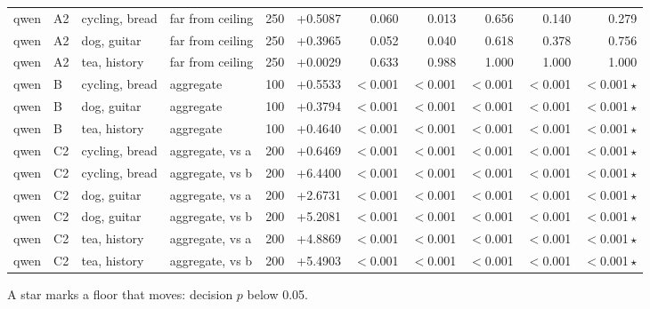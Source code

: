 \begin{center}
\begin{longtable}{llllrrrrrrr}
qwen & A2 & cycling, bread & far from ceiling & 250 & +0.5087 & 0.060 & 0.013 & 0.656 & 0.140 & 0.279 \\
qwen & A2 & dog, guitar & far from ceiling & 250 & +0.3965 & 0.052 & 0.040 & 0.618 & 0.378 & 0.756 \\
qwen & A2 & tea, history & far from ceiling & 250 & +0.0029 & 0.633 & 0.988 & 1.000 & 1.000 & 1.000 \\
qwen & B & cycling, bread & aggregate & 100 & +0.5533 & $<$0.001 & $<$0.001 & $<$0.001 & $<$0.001 & $<$0.001\,$\star$ \\
qwen & B & dog, guitar & aggregate & 100 & +0.3794 & $<$0.001 & $<$0.001 & $<$0.001 & $<$0.001 & $<$0.001\,$\star$ \\
qwen & B & tea, history & aggregate & 100 & +0.4640 & $<$0.001 & $<$0.001 & $<$0.001 & $<$0.001 & $<$0.001\,$\star$ \\
qwen & C2 & cycling, bread & aggregate, vs a & 200 & +0.6469 & $<$0.001 & $<$0.001 & $<$0.001 & $<$0.001 & $<$0.001\,$\star$ \\
qwen & C2 & cycling, bread & aggregate, vs b & 200 & +6.4400 & $<$0.001 & $<$0.001 & $<$0.001 & $<$0.001 & $<$0.001\,$\star$ \\
qwen & C2 & dog, guitar & aggregate, vs a & 200 & +2.6731 & $<$0.001 & $<$0.001 & $<$0.001 & $<$0.001 & $<$0.001\,$\star$ \\
qwen & C2 & dog, guitar & aggregate, vs b & 200 & +5.2081 & $<$0.001 & $<$0.001 & $<$0.001 & $<$0.001 & $<$0.001\,$\star$ \\
qwen & C2 & tea, history & aggregate, vs a & 200 & +4.8869 & $<$0.001 & $<$0.001 & $<$0.001 & $<$0.001 & $<$0.001\,$\star$ \\
qwen & C2 & tea, history & aggregate, vs b & 200 & +5.4903 & $<$0.001 & $<$0.001 & $<$0.001 & $<$0.001 & $<$0.001\,$\star$ \\
\end{longtable}
\end{center}
A star marks a floor that moves: decision $p$ below 0.05.

